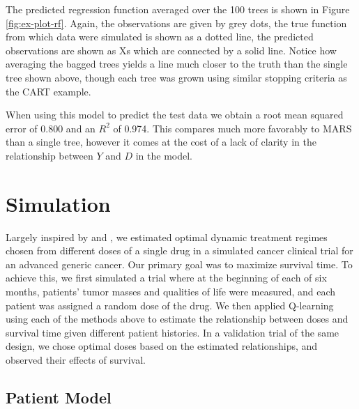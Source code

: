 \documentclass[12pt]{article}
\begin{document}
The predicted regression function averaged over the 100 trees is shown in Figure \ref{fig:ex-plot-rf}. Again, the observations are given by grey dots, the true function from which data were simulated is shown as a dotted line, the predicted observations are shown as Xs which are connected by a solid line. Notice how averaging the bagged trees yields a line much closer to the truth than the single tree shown above, though each tree was grown using similar stopping criteria as the CART example. 

When using this model to predict the test data we obtain a root mean squared error of 0.800 and an $R^2$ of 0.974. This compares much more favorably to MARS than a single tree, however it comes at the cost of a lack of clarity in the relationship between $Y$ and $D$ in the model.



\section{Simulation}

Largely inspired by \textcite{crt} and \textcite{nsclc}, we estimated optimal dynamic treatment regimes chosen from different doses of a single drug in a simulated cancer clinical trial for an advanced generic cancer. Our primary goal was to maximize survival time. To achieve this, we first simulated a trial where at the beginning of each of six months, patients' tumor masses and qualities of life were measured, and each patient was assigned a random dose of the drug. We then applied Q-learning using each of the methods above to estimate the relationship between doses and survival time given different patient histories. In a validation trial of the same design, we chose optimal doses based on the estimated relationships, and observed their effects of survival.

\subsection{Patient Model} %
\label{sub:vpm}

%
\end{document}
